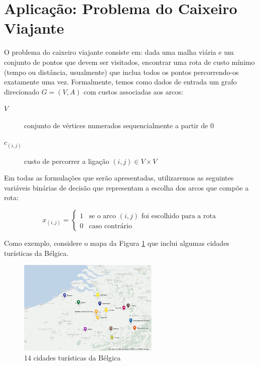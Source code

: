 \documentclass[a4paper,11pt,fleqn]{article}
\begin{document}
\section{Aplicação: Problema do Caixeiro Viajante}

O problema do caixeiro viajante consiste em: dada uma malha viária
e um conjunto de pontos que devem ser visitados, encontrar uma rota
de custo mínimo (tempo ou distância, usualmente) que inclua todos os pontos percorrendo-os exatamente uma vez. Formalmente, temos como dados de entrada um grafo direcionado $G=(V,A)$ com custos associadas aos arcos:
\begin{description}
	\item [{$V$}] conjunto de vértices numerados sequencialmente a partir
	de 0
	\item [{$c_{(i,j)}$}] custo de percorrer a ligação $(i, j) \in V \times V $
\end{description}

Em todas as formulações que serão apresentadas, utilizaremos as seguintes
variáveis binárias de decisão que representam a escolha dos arcos
que compõe a rota:

\[
x_{(i,j)}=\begin{cases}
1 & \textrm{se o arco }(i,j)\textrm{ foi escolhido para a rota}\\
0 & \textrm{caso contrário}
\end{cases}
\]

Como exemplo, considere o mapa da Figura \ref{figG} que inclui algumas cidades turísticas da Bélgica.

\begin{figure}
	\begin{centering}
		\includegraphics[width=0.6\textwidth]{../images/belgium-tourism-14.png}
		\par\end{centering}
	\caption{14 cidades turísticas da Bélgica}	
	\label{figG}
\end{figure}
\end{document}

